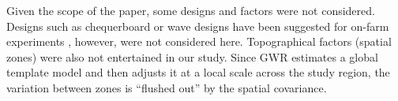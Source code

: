 \documentclass[a4paper]{article} 	%
\begin{document}


Given the scope of the paper, some designs and factors were not considered. Designs such as chequerboard or wave designs have been suggested for on-farm experiments \parencite{bramley1999designing}, however, were not considered here. Topographical factors (spatial zones) were also not entertained in our study. Since GWR estimates a global template model and then adjusts it at a local scale across the study region, the variation between zones is ``flushed out'' by the spatial covariance.


\end{document}
